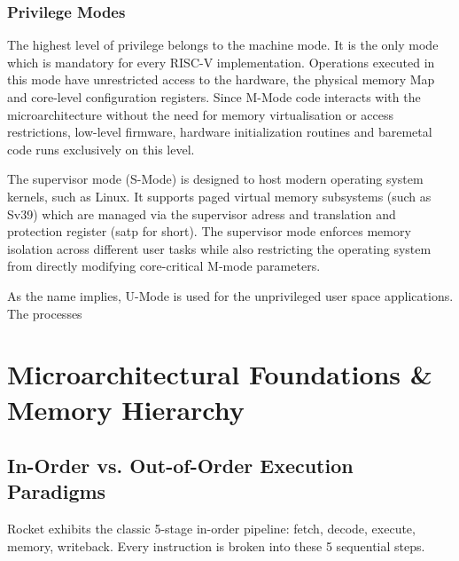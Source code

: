\subsubsection{Privilege Modes}

The highest level of privilege belongs to the machine mode.
It is the only mode which is mandatory for every RISC-V implementation.
Operations executed in this mode have unrestricted access to the hardware, the physical memory Map and core-level configuration registers.
Since M-Mode code interacts with the microarchitecture without the need for memory virtualisation or access restrictions, low-level firmware, hardware initialization routines and baremetal code runs exclusively on this level.

The supervisor mode (S-Mode) is designed to host modern operating system kernels, such as Linux. It supports paged virtual memory subsystems (such as Sv39) which are managed via the supervisor adress and translation and protection register (satp for short). 
The supervisor mode enforces memory isolation across different user tasks while also restricting the operating system from directly modifying core-critical M-mode parameters.

As the name implies, U-Mode is used for the unprivileged user space applications.
The processes


\section{Microarchitectural Foundations \& Memory Hierarchy}

\subsection{In-Order vs. Out-of-Order Execution Paradigms}

Rocket exhibits the classic 5-stage in-order pipeline: fetch, decode, execute, memory, writeback.
Every instruction is broken into these 5 sequential steps.

